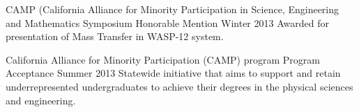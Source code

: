 \begin{cventries}
  \cventry
    {CAMP (California Alliance for Minority Participation in Science, Engineering and Mathematics} %
    {Symposium Honorable Mention} %
    {Winter 2013} %
    {} %
    {Awarded for presentation of Mass Transfer in WASP-12 system.}

  \cventry
    {California Alliance for Minority Participation (CAMP) program} %
    {Program Acceptance} %
    {Summer 2013} %
    {} %
    {Statewide initiative that aims to support and retain underrepresented undergraduates to achieve their degrees in the physical sciences and engineering.}

\end{cventries}
